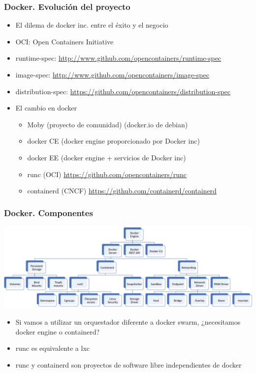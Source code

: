 \documentclass[aspectratio=169]{beamer}
\begin{document}
\begin{frame}
  \frametitle{Docker. Evolución del proyecto}
  \begin{itemize}
  \item El dilema de docker inc. entre el éxito y el negocio
  \item OCI: Open Containers Initiative
  \item runtime-spec: \url{http://www.github.com/opencontainers/runtime-spec}
  \item image-spec: \url{http://www.github.com/opencontainers/image-spec}
  \item distribution-spec: \url{https://github.com/opencontainers/distribution-spec}
  \item El cambio en docker
    \begin{itemize}
    \item Moby (proyecto de comunidad) (docker.io de debian)
    \item docker CE (docker engine proporcionado por Docker inc)
    \item docker EE (docker engine + servicios de Docker inc)
    \item runc (OCI) \url{https://github.com/opencontainers/runc}
    \item containerd (CNCF) \url{https://github.com/containerd/containerd}
    \end{itemize}
  \end{itemize}
\end{frame}

\begin{frame}
  \frametitle{Docker. Componentes}
  \begin{center}
  \includegraphics[width=.7\textwidth]{img/componentes-docker.png}
  \end{center}
  \begin{itemize}
  \item Si vamos a utilizar un orquestador diferente a docker swarm,
    ¿necesitamos docker engine o containerd?
  \item runc es equivalente a lxc
  \item runc y containerd son proyectos de software libre independientes de docker
  \end{itemize}
\end{frame}
\end{document}
